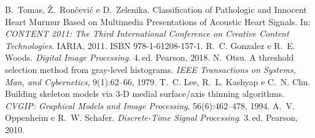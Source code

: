 B.~Tomas, Ž.~Rončević e D.~Zelenika. Classification of Pathologic and Innocent Heart Murmur Based on Multimedia Presentations of Acoustic Heart Signals. In: \emph{CONTENT 2011: The Third International Conference on Creative Content Technologies}. IARIA, 2011. ISBN 978-1-61208-157-1.
 R.~C. Gonzalez e R.~E. Woods. \emph{Digital Image Processing}. 4.\,ed. Pearson, 2018.
 N.~Otsu. A threshold selection method from gray-level histograms. \emph{IEEE Transactions on Systems, Man, and Cybernetics}, 9(1):62--66, 1979.
 T.~C. Lee, R.~L. Kashyap e C.~N. Chu. Building skeleton models via 3-D medial surface/axis thinning algorithms. \emph{CVGIP: Graphical Models and Image Processing}, 56(6):462--478, 1994.
 A.~V. Oppenheim e R.~W. Schafer. \emph{Discrete-Time Signal Processing}. 3.\,ed. Pearson, 2010.
